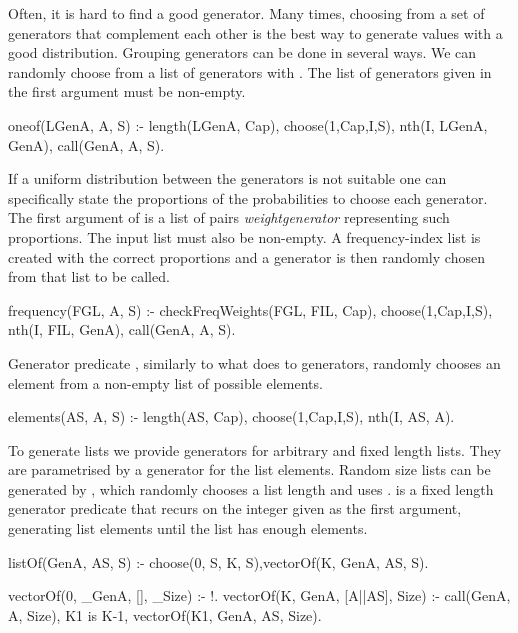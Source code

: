 Often, it is hard to find a good generator.
%
Many times, choosing from a set of generators that complement each other
is the best way to generate values with a good distribution.
%
Grouping generators can be done in several ways.
%
We can randomly choose from a list of generators with .
%
The list of generators given in the first argument must be non-empty.
%
\begin{yapcode}
 oneof(LGenA, A, S) :- length(LGenA, Cap), choose(1,Cap,I,S),
   nth(I, LGenA, GenA), call(GenA, A, S).
\end{yapcode}
%
If a uniform distribution between the generators is not suitable one can
specifically state the proportions of the probabilities to choose each
generator.
%
The first argument of  is a list of pairs
\yap{\{}\emph{weight}\yap{,}\emph{generator}\yap{\}} representing such
proportions.
%
The input list must also be non-empty.
%
A frequency-index list is created with the correct proportions and a
generator is then randomly chosen from that list to be called.
\begin{yapcode}
 frequency(FGL, A, S) :- checkFreqWeights(FGL, FIL, Cap),
   choose(1,Cap,I,S), nth(I, FIL, GenA), call(GenA, A, S).
\end{yapcode}




Generator predicate , similarly to what
 does to generators, randomly chooses an element%
from a non-empty list of possible elements.
%
\begin{yapcode}
 elements(AS, A, S) :-
   length(AS, Cap), choose(1,Cap,I,S), nth(I, AS, A).
\end{yapcode}



To generate lists we provide generators for arbitrary and
fixed length lists.
%
They are %
parametrised by a generator for the list elements.
%
Random size lists can be generated by , which randomly
chooses a list length and uses . 
%
 is a fixed length generator predicate that recurs on
the integer given as the first argument, generating
list elements until the list has enough elements.
\begin{yapcode}
 listOf(GenA, AS, S) :- choose(0, S, K, S),vectorOf(K, GenA, AS, S).

 vectorOf(0, _GenA, [], _Size) :- !.
 vectorOf(K, GenA, [A||AS], Size) :-
   call(GenA, A, Size), K1 is K-1, vectorOf(K1, GenA, AS, Size).
\end{yapcode}


